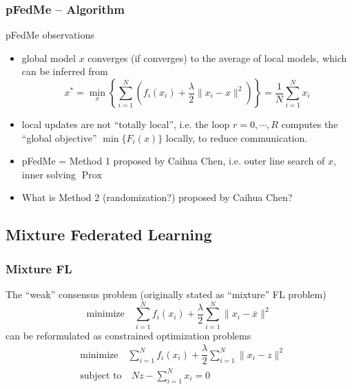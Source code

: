 \begin{frame}
\frametitle{pFedMe -- Algorithm}

\begin{block}{pFedMe observations}
\begin{itemize}
    \item global model $x$ converges (if converges) to the average of local models, which can be inferred from
    $$x^* = \min_{x} \left\{ \sum\limits_{i=1}^N \left( f_i(x_i) + \dfrac{\lambda}{2} \lVert x_i - x \rVert^2 \right) \right\} = \frac{1}{N} \sum\limits_{i=1}^N x_i$$
    \item local updates are not ``totally local'', i.e. the loop $r = 0, \cdots, R$ computes the ``global objective'' $\min\{F_i(x)\}$ locally, to reduce communication.
    \item pFedMe = Method 1 proposed by Caihua Chen, i.e. outer line search of $x$, inner solving $\operatorname{Prox}$
    \item What is Method 2 (randomization?) proposed by Caihua Chen?
\end{itemize}
\end{block}

\end{frame}


\subsection[Mixture FL]{Mixture Federated Learning}


\begin{frame}
\frametitle{Mixture FL}

The {\color{red} ``weak'' consensus problem} (originally stated as ``mixture'' FL problem)
$$\text{minimize} \quad \sum\limits_{i=1}^N f_i(x_i) + \dfrac{\lambda}{2} \sum\limits_{i=1}^N \lVert x_i - \overline{x} \rVert^2$$
can be reformulated as constrained optimization problems
\begin{align*}
    & \text{minimize} \quad \sum\limits_{i=1}^N f_i(x_i) + \dfrac{\lambda}{2} \sum\limits_{i=1}^N \lVert x_i - z \rVert^2 \\
    & \text{subject to} \quad Nz - \sum\limits_{i=1}^N x_i = 0
\end{align*}

\end{frame}

